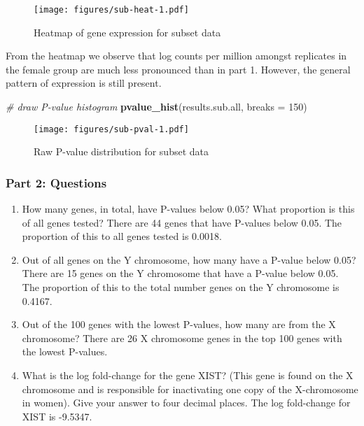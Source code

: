 \documentclass[]{article}
\newenvironment{Shaded}{\begin{snugshade}}{\end{snugshade}}
\newcommand{\KeywordTok}[1]{\textcolor[rgb]{0.13,0.29,0.53}{\textbf{{#1}}}}
\newcommand{\DataTypeTok}[1]{\textcolor[rgb]{0.13,0.29,0.53}{{#1}}}
\newcommand{\DecValTok}[1]{\textcolor[rgb]{0.00,0.00,0.81}{{#1}}}
\newcommand{\CommentTok}[1]{\textcolor[rgb]{0.56,0.35,0.01}{\textit{{#1}}}}
\newcommand{\NormalTok}[1]{{#1}}
\begin{document}
\begin{figure}[htbp]
\centering
\texttt{[image: figures/sub-heat-1.pdf]}
\caption{Heatmap of gene expression for subset data}
\end{figure}

From the heatmap we observe that log counts per million amongst
replicates in the female group are much less pronounced than in part 1.
However, the general pattern of expression is still present.

\begin{Shaded}
\begin{Highlighting}[]
\CommentTok{# draw P-value histogram}
\KeywordTok{pvalue_hist}\NormalTok{(results.sub.all, }\DataTypeTok{breaks =} \DecValTok{150}\NormalTok{)}
\end{Highlighting}
\end{Shaded}

\begin{figure}[htbp]
\centering
\texttt{[image: figures/sub-pval-1.pdf]}
\caption{Raw P-value distribution for subset data}
\end{figure}

\subsubsection{Part 2: Questions}\label{part-2-questions}

\begin{enumerate}
\def\labelenumi{\arabic{enumi}.}
\item
  How many genes, in total, have P-values below 0.05? What proportion is
  this of all genes tested? There are 44 genes that have P-values below
  0.05. The proportion of this to all genes tested is 0.0018.
\item
  Out of all genes on the Y chromosome, how many have a P-value below
  0.05? There are 15 genes on the Y chromosome that have a P-value below
  0.05. The proportion of this to the total number genes on the Y
  chromosome is 0.4167.
\item
  Out of the 100 genes with the lowest P-values, how many are from the X
  chromosome? There are 26 X chromosome genes in the top 100 genes with
  the lowest P-values.
\item
  What is the log fold-change for the gene XIST? (This gene is found on
  the X chromosome and is responsible for inactivating one copy of the
  X-chromosome in women). Give your answer to four decimal places. The
  log fold-change for XIST is -9.5347.
\end{enumerate}
\end{document}
